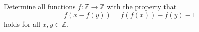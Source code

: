 Determine all functions 
$f:\mathbb{Z}\rightarrow\mathbb{Z}$
 with the property that 
\[f(x-f(y))=f(f(x))-f(y)-1\]
holds for all 
$x,y\in\mathbb{Z}$.
